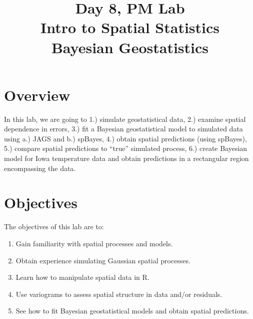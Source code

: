 \documentclass[12pt]{article}
\title{Day 8, PM Lab \\ Intro to Spatial Statistics \\ Bayesian Geostatistics}
\date{}
\begin{document}
\maketitle

\section*{Overview}

In this lab, we are going to 1.) simulate geostatistical data, 2.) examine spatial dependence in errors, 3.) fit a Bayesian geostatistical model to simulated data using a.) JAGS and b.) spBayes, 4.) obtain spatial predictions (using spBayes), 5.) compare spatial predictions to ``true'' simulated process, 6.) create Bayesian model for Iowa temperature data and obtain predictions in a rectangular region encompassing the data. 

\section*{Objectives}
The objectives of this lab are to:
\begin{enumerate}
  \item Gain familiarity with spatial processes and models.
  \item Obtain experience simulating Gaussian spatial processes.  
  \item Learn how to manipulate spatial data in R.  
  \item Use variograms to assess spatial structure in data and/or residuals.  
  \item See how to fit Bayesian geostatistical models and obtain spatial predictions.
\end{enumerate}
\end{document}
